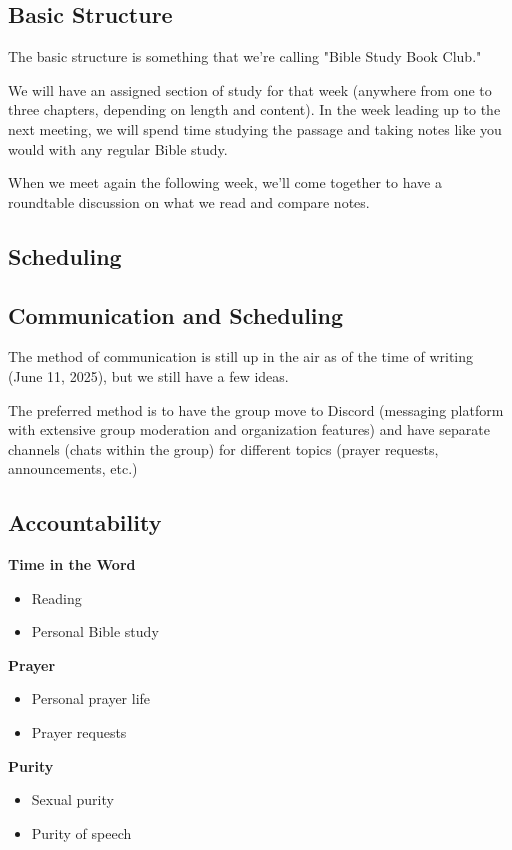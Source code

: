 \documentclass[12pt]{article}
\begin{document}
\subsection{Basic Structure}

The basic structure is something that we're calling "Bible Study Book Club."

We will have an assigned section of study for that week (anywhere from one to
three chapters, depending on length and content). In the week leading up to the
next meeting, we will spend time studying the passage and taking notes like you
would with any regular Bible study.

When we meet again the following week, we'll come together to have a roundtable
discussion on what we read and compare notes.

\subsection{Scheduling}

\subsection{Communication and Scheduling}

	The method of communication is still up in the air as of the time of
	writing (June 11, 2025), but we still have a few ideas.

	The preferred method is to have the group move to Discord (messaging
	platform with extensive group moderation and organization features) and
	have separate channels (chats within the group) for different topics
	(prayer requests, announcements, etc.)

\subsection{Accountability}

\textbf{Time in the Word}
\begin{itemize}

	\item Reading
	\item Personal Bible study


\end{itemize}

\textbf{Prayer}
\begin{itemize}

	\item Personal prayer life
	\item Prayer requests

\end{itemize}

\textbf{Purity}
\begin{itemize}

	\item Sexual purity
	\item Purity of speech

\end{itemize}
\end{document}
